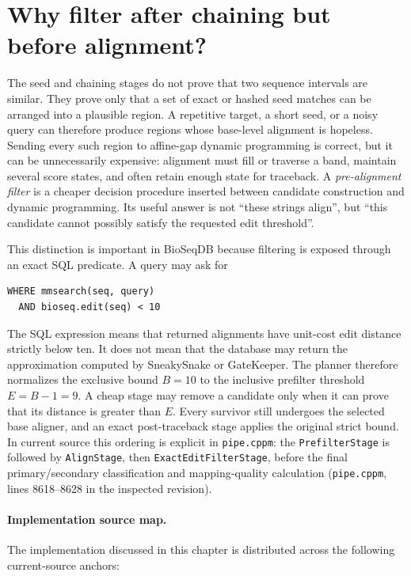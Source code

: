 \section{Why filter after chaining but before alignment?}
\label{sec:prefilter-role}

The seed and chaining stages do not prove that two sequence intervals are
similar.  They prove only that a set of exact or hashed seed matches can be
arranged into a plausible region.  A repetitive target, a short seed, or a
noisy query can therefore produce regions whose base-level alignment is
hopeless.  Sending every such region to affine-gap dynamic programming is
correct, but it can be unnecessarily expensive: alignment must fill or
traverse a band, maintain several score states, and often retain enough state
for traceback.  A \emph{pre-alignment filter} is a cheaper decision procedure
inserted between candidate construction and dynamic programming.  Its useful
answer is not ``these strings align'', but ``this candidate cannot possibly
satisfy the requested edit threshold''.

This distinction is important in BioSeqDB because filtering is exposed through
an exact SQL predicate.  A query may ask for

\begin{verbatim}
WHERE mmsearch(seq, query)
  AND bioseq.edit(seq) < 10
\end{verbatim}

The SQL expression means that returned alignments have unit-cost edit distance
strictly below ten.  It does not mean that the database may return the
approximation computed by SneakySnake or GateKeeper.  The planner therefore
normalizes the exclusive bound \(B=10\) to the inclusive prefilter threshold
\(E=B-1=9\).  A cheap stage may remove a candidate only when it can prove that
its distance is greater than \(E\).  Every survivor still undergoes the selected
base aligner, and an exact post-traceback stage applies the original strict
bound.  In current source this ordering is explicit in
\texttt{pipe.cppm}: the \texttt{PrefilterStage} is followed by
\texttt{AlignStage}, then \texttt{ExactEditFilterStage}, before the final
primary/secondary classification and mapping-quality calculation
(\texttt{pipe.cppm}, lines 8618--8628 in the inspected revision).

\paragraph{Implementation source map.}
The implementation discussed in this chapter is distributed across the
following current-source anchors:

